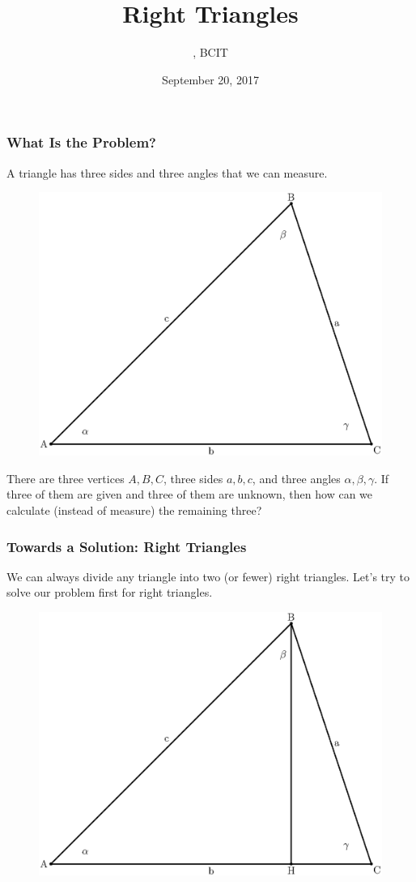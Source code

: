 \documentclass[xcolor=dvipsnames]{beamer}
\title{Right Triangles}
\subtitle{{\CourseNumber}, BCIT}
\author{\CourseName}
\date{September 20, 2017}
\begin{document}
\begin{frame}
  \titlepage
\end{frame}

\begin{frame}
  \frametitle{What Is the Problem?}
A triangle has three sides and three angles that we can measure. 
  \begin{figure}[h]
    \includegraphics[scale=.3]{./acute.eps}
  \end{figure}
There are three vertices $A,B,C$, three sides $a,b,c$, and three
angles $\alpha,\beta,\gamma$. If three of them are given and three of
them are unknown, then how can we calculate (instead of measure) the
remaining three?
\end{frame}

\begin{frame}
  \frametitle{Towards a Solution: Right Triangles}
We can always divide any triangle into two (or fewer) right triangles.
Let's try to solve our problem first for right triangles.
  \begin{figure}[h]
    \includegraphics[scale=.3]{./acute-with-height.eps}
  \end{figure}
\end{frame}
\end{document}

